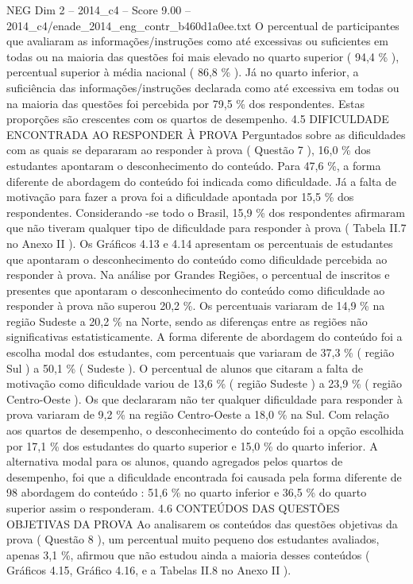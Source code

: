 \begin{textsample}{NEG Dim 2 – 2014\_c4 – Score 9.00 – 2014\_c4/enade\_2014\_eng\_contr\_b460d1a0ee.txt}
O percentual de participantes que avaliaram as informações/instruções como até excessivas ou suficientes em todas ou na maioria das questões foi mais elevado no quarto superior ( 94,4 \% ), percentual superior à média nacional ( 86,8 \% ).
Já no quarto inferior, a suficiência das informações/instruções declarada como até excessiva em todas ou na maioria das questões foi percebida por 79,5 \% dos respondentes.
Estas proporções são crescentes com os quartos de desempenho. 4.5 DIFICULDADE ENCONTRADA AO RESPONDER À PROVA Perguntados sobre as dificuldades com as quais se depararam ao responder à prova ( Questão 7 ), 16,0 \% dos estudantes apontaram o desconhecimento do conteúdo.
Para 47,6 \%, a forma diferente de abordagem do conteúdo foi indicada como dificuldade.
Já a falta de motivação para fazer a prova foi a dificuldade apontada por 15,5 \% dos respondentes.
Considerando -se todo o Brasil, 15,9 \% dos respondentes afirmaram que não tiveram qualquer tipo de dificuldade para responder à prova ( Tabela II.7 no Anexo II ).
Os Gráficos 4.13 e 4.14 apresentam os percentuais de estudantes que apontaram o desconhecimento do conteúdo como dificuldade percebida ao responder à prova.
Na análise por Grandes Regiões, o percentual de inscritos e presentes que apontaram o desconhecimento do conteúdo como dificuldade ao responder à prova não superou 20,2 \%.
Os percentuais variaram de 14,9 \% na região Sudeste a 20,2 \% na Norte, sendo as diferenças entre as regiões não significativas estatisticamente.
A forma diferente de abordagem do conteúdo foi a escolha modal dos estudantes, com percentuais que variaram de 37,3 \% ( região Sul ) a 50,1 \% ( Sudeste ).
O percentual de alunos que citaram a falta de motivação como dificuldade variou de 13,6 \% ( região Sudeste ) a 23,9 \% ( região Centro-Oeste ).
Os que declararam não ter qualquer dificuldade para responder à prova variaram de 9,2 \% na região Centro-Oeste a 18,0 \% na Sul.
Com relação aos quartos de desempenho, o desconhecimento do conteúdo foi a opção escolhida por 17,1 \% dos estudantes do quarto superior e 15,0 \% do quarto inferior.
A alternativa modal para os alunos, quando agregados pelos quartos de desempenho, foi que a dificuldade encontrada foi causada pela forma diferente de 98 abordagem do conteúdo : 51,6 \% no quarto inferior e 36,5 \% do quarto superior assim o responderam. 4.6 CONTEÚDOS DAS QUESTÕES OBJETIVAS DA PROVA Ao analisarem os conteúdos das questões objetivas da prova ( Questão 8 ), um percentual muito pequeno dos estudantes avaliados, apenas 3,1 \%, afirmou que não estudou ainda a maioria desses conteúdos ( Gráficos 4.15, Gráfico 4.16, e a Tabelas II.8 no Anexo II ).

\end{textsample}
